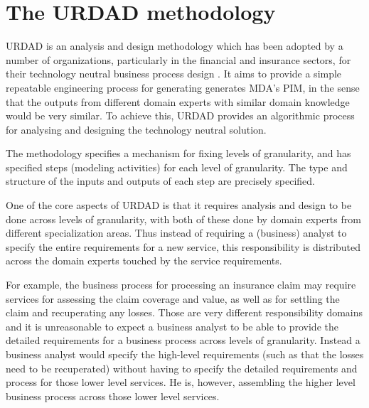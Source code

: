 \section{The URDAD methodology}
\label{sec:urdad}

URDAD
\cite{solms:generatingMdasPimUsingUrdad,
solms:urdad}
is an analysis and design methodology which has been adopted by a number
of organizations, particularly in the financial and insurance
sectors, for their technology neutral business process design  \cite{klopper:compareSoftwareMethodologies}.
It aims to provide a simple repeatable engineering process for
generating generates MDA's PIM, in the sense that the
outputs from different domain experts with similar
domain knowledge would be very similar. To achieve this,
URDAD provides an algorithmic process for analysing and
designing the technology neutral solution.

The methodology specifies a mechanism for fixing levels
of granularity, and has specified steps (modeling activities) for each
level of granularity. The type and structure of the
inputs and outputs of each step are precisely specified.

One of the core aspects of URDAD is that it requires analysis
and design to be done across levels of granularity, with both
of these done by domain experts from different specialization
areas. Thus instead of requiring a (business) analyst
to specify the entire requirements for a new service,
this responsibility is distributed across the domain experts 
touched by the service requirements.

For example, the business
process for processing an insurance claim may require services
for assessing the claim coverage and value, as well as for
settling the claim and recuperating any losses. Those are
very different responsibility domains and it is unreasonable
to expect a business analyst to be able to provide the detailed
requirements for a business process across levels of
granularity. Instead a business analyst would specify the high-level 
requirements (such as that the losses need to be recuperated)
without having to specify the detailed requirements and process
for those lower level services. He is, however, assembling the higher
level business process across those lower level services.

